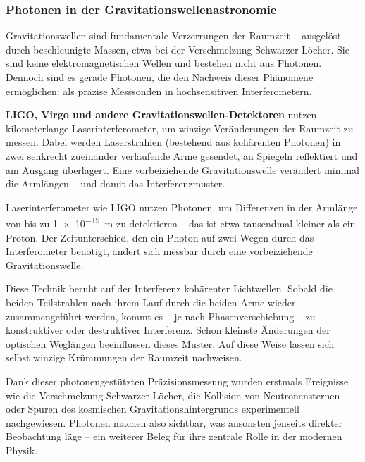 \subsubsection{Photonen in der Gravitationswellenastronomie}

Gravitationswellen sind fundamentale Verzerrungen der Raumzeit – ausgelöst durch beschleunigte Massen, etwa bei der Verschmelzung Schwarzer Löcher. Sie sind keine elektromagnetischen Wellen und bestehen nicht aus Photonen. Dennoch sind es gerade Photonen, die den Nachweis dieser Phänomene ermöglichen: als präzise Messsonden in hochsensitiven Interferometern.

\vspace{0.5em}
\textbf{LIGO, Virgo und andere Gravitationswellen-Detektoren} nutzen kilometerlange Laserinterferometer, um winzige Veränderungen der Raumzeit zu messen. Dabei werden Laserstrahlen (bestehend aus kohärenten Photonen) in zwei senkrecht zueinander verlaufende Arme gesendet, an Spiegeln reflektiert und am Ausgang überlagert. Eine vorbeiziehende Gravitationswelle verändert minimal die Armlängen – und damit das Interferenzmuster.

\medskip
\begin{tcolorbox}[physikbox, title=Photonen als Messwerkzeug für Raumkrümmung]
	\label{box:messwerkzeug}
	\small
	Laserinterferometer wie LIGO nutzen Photonen, um Differenzen in der Armlänge von bis zu \SI{1e-19}{m} zu detektieren – das ist etwa tausendmal kleiner als ein Proton. Der Zeitunterschied, den ein Photon auf zwei Wegen durch das Interferometer benötigt, ändert sich messbar durch eine vorbeiziehende Gravitationswelle.
\end{tcolorbox}

Diese Technik beruht auf der Interferenz kohärenter Lichtwellen. Sobald die beiden Teilstrahlen nach ihrem Lauf durch die beiden Arme wieder zusammengeführt werden, kommt es – je nach Phasenverschiebung – zu konstruktiver oder destruktiver Interferenz. Schon kleinste Änderungen der optischen Weglängen beeinflussen dieses Muster. Auf diese Weise lassen sich selbst winzige Krümmungen der Raumzeit nachweisen.

\vspace{0.5em}
Dank dieser photonengestützten Präzisionsmessung wurden erstmals Ereignisse wie die Verschmelzung Schwarzer Löcher, die Kollision von Neutronensternen oder Spuren des kosmischen Gravitationshintergrunds experimentell nachgewiesen. Photonen machen also sichtbar, was ansonsten jenseits direkter Beobachtung läge – ein weiterer Beleg für ihre zentrale Rolle in der modernen Physik.

